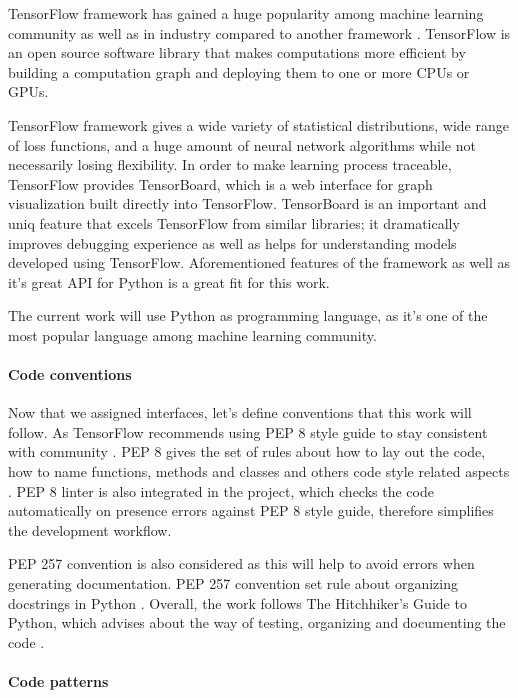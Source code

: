 TensorFlow framework has gained a huge popularity among machine learning
community as well as in industry compared to another framework \cite{DBLP:journals/corr/Goldsborough16}.
TensorFlow is an open source software library that makes computations more
efficient by building a computation graph and deploying them to one or more
CPUs or GPUs.


TensorFlow framework gives a wide variety of statistical distributions, wide
range of loss functions, and a huge amount of neural network algorithms while
not necessarily losing  flexibility. In order to make learning process traceable,
TensorFlow provides TensorBoard, which is a web interface for graph visualization
built directly into TensorFlow.
TensorBoard is an important and uniq feature that excels TensorFlow from similar
libraries; it dramatically improves debugging experience as well as helps
for understanding models developed using TensorFlow.
Aforementioned features of the framework as well
as it's great API for Python is a great fit for this work.

The current work will use Python as programming language, as it's one of
the most popular language among machine learning community.


\paragraph{Code conventions}
Now that we assigned interfaces, let's define conventions that this work
will follow. As TensorFlow recommends using PEP 8 style guide to stay consistent
with community \cite{TfWeb}. PEP 8 gives the set of rules about how to lay out
the code, how to name functions, methods and classes and others code style related
aspects \cite{Rossum}. PEP 8 linter is also integrated in the project, which checks the code
automatically on presence errors against PEP 8 style guide,
therefore simplifies the development workflow.

PEP 257 convention is also considered as this will help to avoid errors when
generating documentation. PEP 257 convention set rule about organizing
docstrings in Python \cite{Goodger2001}.
Overall, the work follows The Hitchhiker's Guide to Python, which advises
about the way of testing, organizing and documenting the code \cite{Reitz}.

\paragraph{Code patterns}


